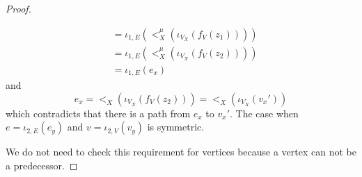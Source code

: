 \begin{proof}
\begin{itemize}
\begin{itemize}
\begin{align*}
                                                                &= \iota_{1,E}(<_{X}^{\mu}(\iota_{V_{X}}(f_{V}(z_1))))\\
                                                                &= \iota_{1,E}(<_{X}^{\mu}(\iota_{V_{X}}(f_{V}(z_2))))\\
                                                                &= \iota_{1,E}(e_{x})
                    \end{align*}
                      and
                      \[
                        e_{x} = <_{X}(\iota_{V_{X}}(f_{V}(z_2))) = <_{X}(\iota_{V_{X}}(v_{x}'))
                      \]
                      which contradicts that there is a path from $e_{x}$ to $v_{x}'$.
                      The case when $e = \iota_{2,E}(e_{y})$ and $v = \iota_{2,V}(v_{y})$ is symmetric.
            \end{itemize}
    \end{itemize}                  
      We do not need to check this requirement for vertices because a vertex can not be a predecessor.
\end{proof}

